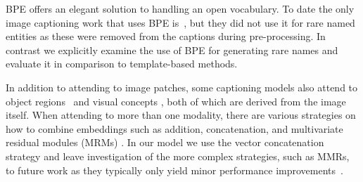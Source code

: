 BPE offers an elegant solution to handling an open vocabulary. To date the only
image captioning work that uses BPE is~\cite{Zhao2019InformativeIC}, but they
did not use it for rare named entities as these were removed from
the captions during pre-processing. In contrast we explicitly examine the use
of BPE for generating rare names and evaluate it in comparison to
template-based methods.


In addition to attending to image patches, some captioning models also attend
to object regions~\cite{Wang2019Hierarchical} and visual concepts
\cite{You2016ImageCW,Li2019Boosted,Wang2019Hierarchical}, both of which are
derived from the image itself. When attending to more than one modality, there
are various strategies on how to combine embeddings such as addition,
concatenation, and multivariate residual modules (MRMs)
\cite{Kim2016MultimodalRL}. In our model we use the vector concatenation
strategy and leave investigation of the more complex strategies, such as MMRs,
to future work as they typically only yield minor performance
improvements~\cite{Wang2019Hierarchical}.
